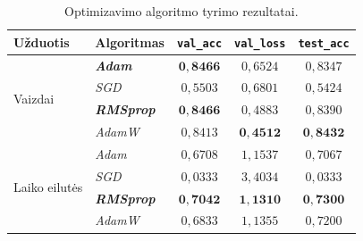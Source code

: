 \begin{table}[H]
    \centering
    \caption{Optimizavimo algoritmo tyrimo rezultatai.}
    \begin{tabular}{|l|l|c|c|c|}
        \hline
        Užduotis & Algoritmas & \texttt{val\_acc} & \texttt{val\_loss} & \texttt{test\_acc} \\
        \hline
        \multirow{4}{*}{Vaizdai}
            & \textbf{\textit{Adam}}    & $\mathbf{0{,}8466}$ & $0{,}6524$ & $0{,}8347$ \\ \cline{2-5}
            & \textit{SGD}              & $0{,}5503$ & $0{,}6801$ & $0{,}5424$ \\ \cline{2-5}
            & \textbf{\textit{RMSprop}} & $\mathbf{0{,}8466}$ & $0{,}4883$ & $0{,}8390$ \\ \cline{2-5}
            & \textit{AdamW}            & $0{,}8413$ & $\mathbf{0{,}4512}$ & $\mathbf{0{,}8432}$ \\
        \hline
        \multirow{4}{*}{Laiko eilutės}
            & \textit{Adam}             & $0{,}6708$ & $1{,}1537$ & $0{,}7067$ \\ \cline{2-5}
            & \textit{SGD}              & $0{,}0333$ & $3{,}4034$ & $0{,}0333$ \\ \cline{2-5}
            & \textbf{\textit{RMSprop}} & $\mathbf{0{,}7042}$ & $\mathbf{1{,}1310}$ & $\mathbf{0{,}7300}$ \\ \cline{2-5}
            & \textit{AdamW}            & $0{,}6833$ & $1{,}1355$ & $0{,}7200$ \\
        \hline
    \end{tabular}
    \label{tab:rez_optimizatorius}
\end{table}
